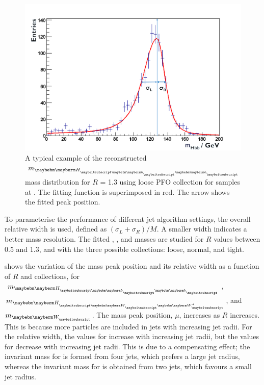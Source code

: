 \begin{figure}[!htbp]
\includegraphics[width=\largefigwidth]{doubleHiggs/MCmassFit2}
\caption[Example MC mass fit for jet optimisation in double Higgs analysis]%
   {A typical example of the reconstructed $m_{\Hbb}$  mass distribution for $R$ = 1.3 using loose PFO collection for \eeToHHbbWWHad samples at .  The fitting function is superimposed in red. The arrow shows the fitted peak position. }
   \label{fig:doubleHiggsFitMCMass}
\end{figure}


To parameterise the performance of different jet algorithm settings, the overall relative width is used, defined as $\left(\sigma_L  + \sigma_R\right)/M$. A smaller width indicates a  better mass resolution. The fitted \Hbb, \HWW, and \PW masses are studied for $R$ values between 0.5 and 1.3, and with the three possible \PFO collections: loose, normal, and tight.


 shows the variation of the mass peak position and its relative width as a function of $R$ and \PFO collections, for $m_{\Hbb}$, $m_{\HWW}$, and $m_{\PW}$. The mass peak position, $\mu$, increases as $R$ increases. This is because more particles are included in jets with increasing jet radii. For the relative width, the values for \Hbb  increase with increasing jet radii, but the values for \HWW decrease  with increasing jet radii. This is due to a compensating effect; the invariant mass for \HWW is formed from four jets, which prefers a large jet radius, whereas the invariant mass for \Hbb is obtained from two jets, which favours a small jet radius.

